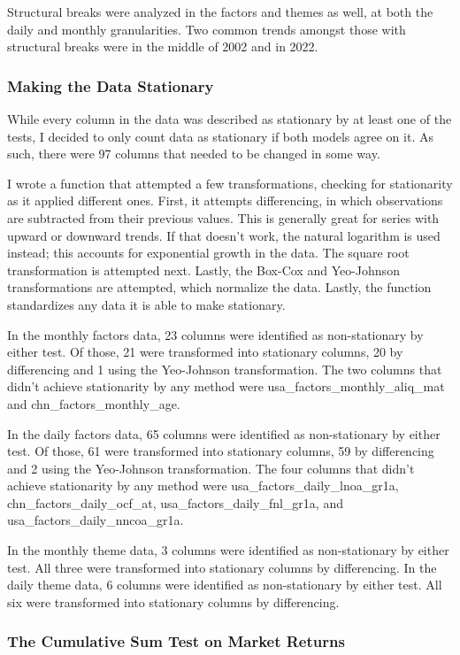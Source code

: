 Structural breaks were analyzed in the factors and themes as well, at both the daily and monthly granularities. Two  common trends amongst those with structural breaks were in the middle of 2002 and in 2022.

\subsubsection{Making the Data Stationary}

While every column in the data was described as stationary by at least one of the tests, I decided to only count data as stationary if both models agree on it. As such, there were 97 columns that needed to be changed in some way.

I wrote a function that attempted a few transformations, checking for stationarity as it applied different ones. First, it attempts differencing, in which observations are subtracted from their previous values. This is generally great for series with upward or downward trends. If that doesn't work, the natural logarithm is used instead; this accounts for exponential growth in the data. The square root transformation is attempted next. Lastly, the Box-Cox and Yeo-Johnson transformations are attempted, which normalize the data. Lastly, the function standardizes any data it is able to make stationary.

In the monthly factors data, 23 columns were identified as non-stationary by either test. Of those, 21 were transformed into stationary columns, 20 by differencing and 1 using the Yeo-Johnson transformation. The two columns that didn't achieve stationarity by any method were usa\_factors\_monthly\_aliq\_mat and chn\_factors\_monthly\_age.

In the daily factors data, 65 columns were identified as non-stationary by either test. Of those, 61 were transformed into stationary columns, 59 by differencing and 2 using the Yeo-Johnson transformation. The four columns that didn't achieve stationarity by any method were usa\_factors\_daily\_lnoa\_gr1a, chn\_factors\_daily\_ocf\_at, usa\_factors\_daily\_fnl\_gr1a, and usa\_factors\_daily\_nncoa\_gr1a.

In the monthly theme data, 3 columns were identified as non-stationary by either test. All three were transformed into stationary columns by differencing. In the daily theme data, 6 columns were identified as non-stationary by either test. All six were transformed into stationary columns by differencing.

\subsubsection{The Cumulative Sum Test on Market Returns}

